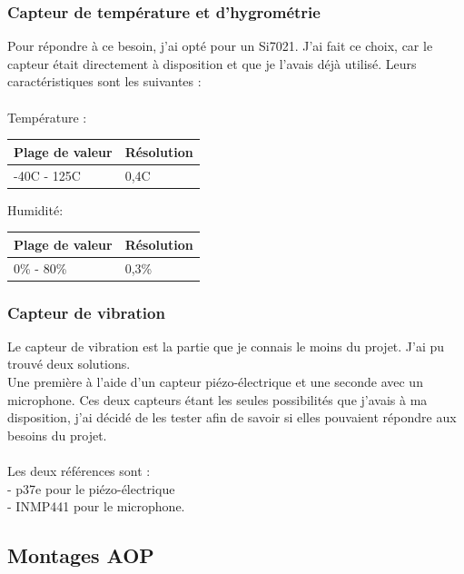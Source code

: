 \documentclass[11pt,french,a4paper]{article}
\begin{document}
\subsubsection{Capteur de température et d'hygrométrie }
Pour répondre à ce besoin, j'ai opté pour un Si7021. J'ai fait ce choix, car le capteur était directement à disposition et que je l'avais déjà utilisé. Leurs caractéristiques sont les suivantes :\\
\\
Température :\\
\begin{center}
    \begin{tabular}{|l|l|}
	\hline
	    Plage de valeur & Résolution \\
	\hline
	    -40C - 125C & 0,4C \\
	\hline
    \end{tabular}
\end{center}
Humidité:\\
\begin{center}
    \begin{tabular}{|l|l|}
	\hline
	    Plage de valeur & Résolution \\
	\hline
	    0\% - 80\% & 0,3\% \\
	\hline
    \end{tabular}
\end{center}

\subsubsection{Capteur de vibration}
Le capteur de vibration est la partie que je connais le moins du projet. J'ai pu trouvé deux solutions.\\
 Une première à l'aide d'un capteur piézo-électrique et une seconde avec un  microphone. Ces deux capteurs étant les seules possibilités que j'avais à ma disposition, 
 j'ai décidé de les tester afin de savoir si elles pouvaient répondre aux besoins du projet.\\
\\
 Les deux références sont :\\
- p37e pour le piézo-électrique\\
- INMP441 pour le microphone.\\

\subsection{Montages AOP}
\end{document}
